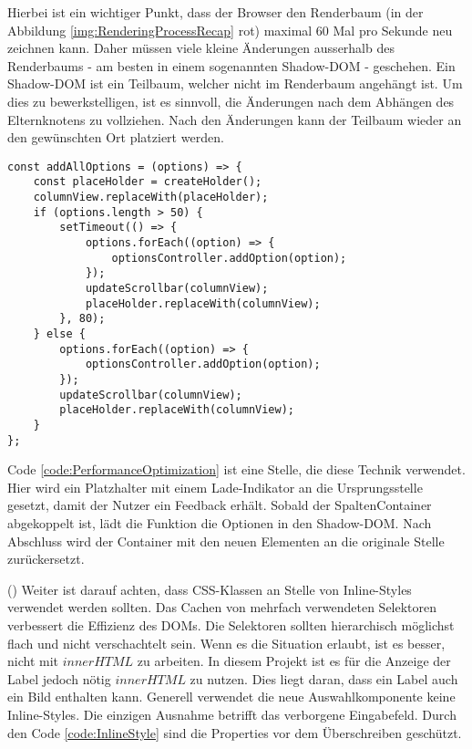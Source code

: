 Hierbei ist ein wichtiger Punkt, dass der Browser den Renderbaum (in der Abbildung \ref{img:RenderingProcessRecap} rot) maximal 60 Mal pro Sekunde neu zeichnen kann.
Daher müssen viele kleine Änderungen ausserhalb des Renderbaums - am besten in einem sogenannten Shadow-DOM - geschehen.
Ein Shadow-DOM ist ein Teilbaum, welcher nicht im Renderbaum angehängt ist.
Um dies zu bewerkstelligen, ist es sinnvoll, die Änderungen nach dem Abhängen des Elternknotens zu vollziehen. 
Nach den Änderungen kann der Teilbaum wieder an den gewünschten Ort platziert werden.

\begin{lstlisting}[style = htmlcssjs, caption = Performance Optimierung (columnOptionsComponent.js), label = code:PerformanceOptimization]
const addAllOptions = (options) => {
    const placeHolder = createHolder();
    columnView.replaceWith(placeHolder);
    if (options.length > 50) {
        setTimeout(() => {
            options.forEach((option) => {
                optionsController.addOption(option);
            });
            updateScrollbar(columnView);
            placeHolder.replaceWith(columnView);
        }, 80);
    } else {
        options.forEach((option) => {
            optionsController.addOption(option);
        });
        updateScrollbar(columnView);
        placeHolder.replaceWith(columnView);
    }
};
\end{lstlisting}

Code \ref{code:PerformanceOptimization} ist eine Stelle, die diese Technik verwendet.
Hier wird ein Platzhalter mit einem Lade-Indikator an die Ursprungsstelle gesetzt, damit der Nutzer ein Feedback erhält.
Sobald der SpaltenContainer abgekoppelt ist, lädt die Funktion die Optionen in den Shadow-DOM.
Nach Abschluss wird der Container mit den neuen Elementen an die originale Stelle zurückersetzt.

(\cite{efficientDomManipulation}) Weiter ist darauf achten, dass CSS-Klassen an Stelle von Inline-Styles verwendet werden sollten.
Das Cachen von mehrfach verwendeten Selektoren verbessert die Effizienz des DOMs.
Die Selektoren sollten hierarchisch möglichst flach und nicht verschachtelt sein.
Wenn es die Situation erlaubt, ist es besser, nicht mit $innerHTML$ zu arbeiten.
In diesem Projekt ist es für die Anzeige der Label jedoch nötig $innerHTML$ zu nutzen.
Dies liegt daran, dass ein Label auch ein Bild enthalten kann.
Generell verwendet die neue Auswahlkomponente keine Inline-Styles.
Die einzigen Ausnahme betrifft das verborgene Eingabefeld. 
Durch den Code \ref{code:InlineStyle} sind die Properties vor dem Überschreiben geschützt.

